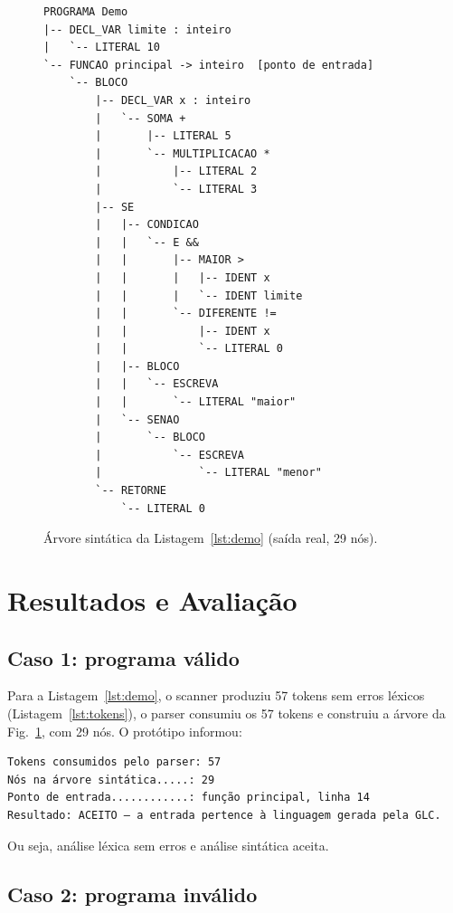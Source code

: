 \documentclass[conference,a4paper]{IEEEtran}
\begin{document}
\begin{figure}[t]
\centering
\begin{lstlisting}[style=saida,frame=none,backgroundcolor=\color{white},breaklines=false]
PROGRAMA Demo
|-- DECL_VAR limite : inteiro
|   `-- LITERAL 10
`-- FUNCAO principal -> inteiro  [ponto de entrada]
    `-- BLOCO
        |-- DECL_VAR x : inteiro
        |   `-- SOMA +
        |       |-- LITERAL 5
        |       `-- MULTIPLICACAO *
        |           |-- LITERAL 2
        |           `-- LITERAL 3
        |-- SE
        |   |-- CONDICAO
        |   |   `-- E &&
        |   |       |-- MAIOR >
        |   |       |   |-- IDENT x
        |   |       |   `-- IDENT limite
        |   |       `-- DIFERENTE !=
        |   |           |-- IDENT x
        |   |           `-- LITERAL 0
        |   |-- BLOCO
        |   |   `-- ESCREVA
        |   |       `-- LITERAL "maior"
        |   `-- SENAO
        |       `-- BLOCO
        |           `-- ESCREVA
        |               `-- LITERAL "menor"
        `-- RETORNE
            `-- LITERAL 0
\end{lstlisting}
\caption{Árvore sintática da Listagem~\ref{lst:demo} (saída real, 29 nós).}
\label{fig:arvore}
\end{figure}

\section{Resultados e Avaliação}

\subsection{Caso 1: programa válido}

Para a Listagem~\ref{lst:demo}, o scanner produziu 57 tokens sem erros léxicos (Listagem~\ref{lst:tokens}), o parser consumiu os 57 tokens e construiu a árvore da Fig.~\ref{fig:arvore}, com 29 nós. O protótipo informou:
\begin{lstlisting}[style=saida]
Tokens consumidos pelo parser: 57
Nós na árvore sintática.....: 29
Ponto de entrada............: função principal, linha 14
Resultado: ACEITO — a entrada pertence à linguagem gerada pela GLC.
\end{lstlisting}
Ou seja, análise léxica sem erros e análise sintática aceita.

\subsection{Caso 2: programa inválido}
\end{document}
